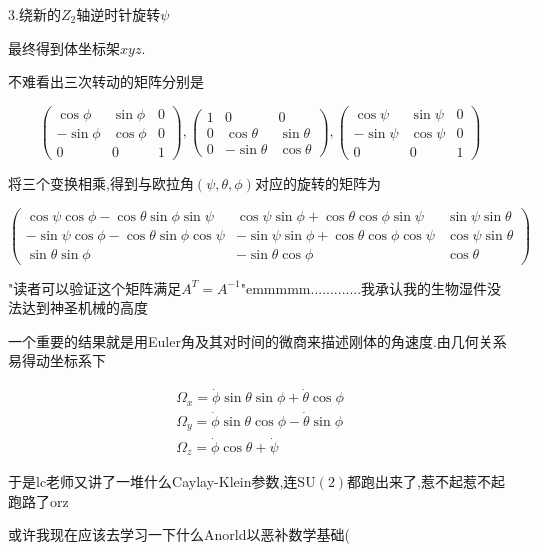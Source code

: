 \documentclass[UTF8]{article}
\begin{document}
	3.绕新的$Z_2$轴逆时针旋转$\psi$
	
	最终得到体坐标架$xyz$.
	
	不难看出三次转动的矩阵分别是
	
	\[
	\begin{pmatrix}
		\cos\phi&\sin\phi&0\\
		-\sin\phi&\cos\phi&0\\
		0&0&1
	\end{pmatrix}
	,
	\begin{pmatrix}
		1&0&0\\
		0&\cos\theta&\sin\theta\\
		0&-\sin\theta&\cos\theta
	\end{pmatrix}
	,
	\begin{pmatrix}
		\cos\psi&\sin\psi&0\\
		-\sin\psi&\cos\psi&0\\
		0&0&1
	\end{pmatrix}
	\]
	
	将三个变换相乘,得到与欧拉角$(\psi,\theta,\phi)$对应的旋转的矩阵为
	
	\[
	\begin{pmatrix}
		\cos \psi \cos \phi-\cos \theta \sin \phi \sin \psi & \cos \psi \sin \phi+\cos \theta \cos \phi \sin \psi & \sin \psi \sin \theta \\
		-\sin \psi \cos \phi-\cos \theta \sin \phi \cos \psi & -\sin \psi \sin \phi+\cos \theta \cos \phi \cos \psi & \cos \psi \sin \theta \\
		\sin \theta \sin \phi & -\sin \theta \cos \phi & \cos \theta
	\end{pmatrix}
	\]
	
	"读者可以验证这个矩阵满足$A^T=A^{-1}$"emmmmm.............我承认我的生物湿件没法达到神圣机械的高度
	
	一个重要的结果就是用Euler角及其对时间的微商来描述刚体的角速度.由几何关系易得动坐标系下
	
	\[
	\begin{matrix}
		\Omega_x=\dot{\phi}\sin\theta\sin\phi+\dot{\theta}\cos\phi\\
		\Omega_y=\dot{\phi}\sin\theta\cos\phi-\dot{\theta}\sin\phi\\
		\Omega_z=\dot{\phi}\cos\theta+\dot{\psi}
	\end{matrix}
	\]
	
	于是lc老师又讲了一堆什么Caylay-Klein参数,连$\mathrm{SU(2)}$都跑出来了,惹不起惹不起跑路了orz
	
	或许我现在应该去学习一下什么Anorld以恶补数学基础(
	
\end{document}
